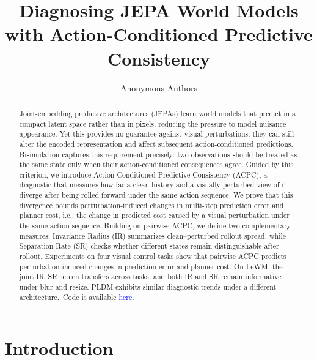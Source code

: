 \documentclass{article}
\title{Diagnosing JEPA World Models with Action-Conditioned Predictive Consistency}
\author{Anonymous Authors}
\newcommand{\blindsubmission}{}
\begin{document}
\maketitle

\begin{abstract}
Joint-embedding predictive architectures (JEPAs) learn world models that
predict in a compact latent space rather than in pixels, reducing the
pressure to model nuisance appearance. Yet this provides no guarantee against visual perturbations: they can
still alter the encoded representation and affect subsequent
action-conditioned predictions.
Bisimulation captures this requirement precisely: two observations should be
treated as the same state only when their action-conditioned consequences
agree. Guided by this criterion, we introduce Action-Conditioned Predictive
Consistency (ACPC), a diagnostic that measures how far a clean history and
a visually perturbed view of it diverge after being rolled forward under the
same action sequence. We prove that this divergence bounds perturbation-induced changes in multi-step prediction error and planner cost, i.e., the change in predicted cost caused by a visual perturbation under the same action sequence. Building on pairwise ACPC, we define two complementary measures: Invariance Radius (IR) summarizes clean--perturbed rollout spread, while Separation Rate (SR) checks whether different states remain distinguishable after rollout.
Experiments on four visual control tasks show that pairwise ACPC predicts perturbation-induced changes in prediction error and planner cost. On LeWM, the joint IR--SR screen
transfers across tasks, and both IR and SR remain informative under blur and
resize. PLDM exhibits similar diagnostic trends
under a different architecture.\ifdefined\blindsubmission\else\
Code is available \href{\paperpubliccodeurl}{\textcolor{blue}{here}}.\fi

\end{abstract}

\section{Introduction}\label{sec:intro}
\end{document}
